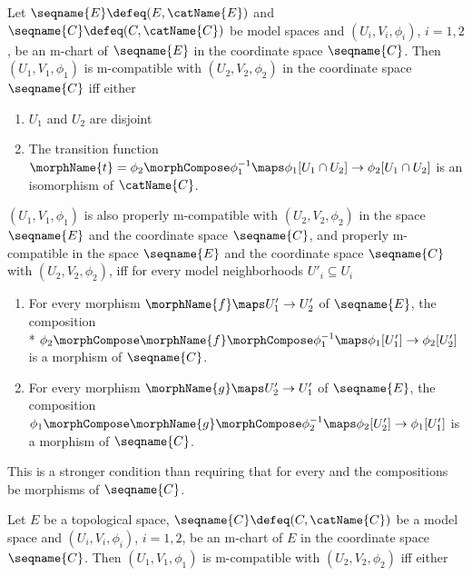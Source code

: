\documentclass{article}
\begin{document}
\begin{definition}[M-compatibility]
\label{def:M-compat}
Let $\seqname{E} \defeq (E, \catName{E})$ and
$\seqname{C} \defeq (C, \catName{C})$ be model spaces and
$(U_i, V_i, \phi_i)$, $i=1,2$, be an m-chart of $\seqname{E}$ in the
coordinate space $\seqname{C}$. Then $(U_1, V_1, \phi_1)$ is
m-compatible with $(U_2, V_2, \phi_2)$ in the coordinate space
$\seqname{C}$ iff either

\begin{enumerate}
\item $U_1$ and $U_2$ are disjoint

\item The transition function
$
  \morphName{t}=\phi_2 \morphCompose \phi^{-1}_1
  \maps \phi_1[U_1 \cap U_2] \to \phi_2[U_1 \cap U_2]
$
is an isomorphism of $\catName{C}$.
\end{enumerate}

$(U_1, V_1, \phi_1)$ is also properly m-compatible with
\nobreaks
  {{
    $(U_2, V_2, \phi_2)$
  }}
in the space $\seqname{E}$ and the coordinate space $\seqname{C}$, and
properly m-compatible in the space $\seqname{E}$ and the coordinate
space $\seqname{C}$ with
\nobreaks
  {{
    $(U_2, V_2, \phi_2)$,
  }}
iff
for every model neighborhoods $U'_i \subseteq U_i$

\begin{enumerate}
\item
For every morphism $\morphName{f} \maps U'_1 \to U'_2$ of $\seqname{E}$,
the composition \\*
$
  \phi_2 \morphCompose \morphName{f} \morphCompose \phi^{-1}_1
  \maps \phi_1[U'_1] \to \phi_2[U'_2]
$
is a morphism of $\seqname{C}$.

\item
For every morphism $\morphName{g} \maps U'_2 \to U'_1$ of $\seqname{E}$,
the composition
$
  \phi_1 \morphCompose \morphName{g} \morphCompose \phi^{-1}_2
  \maps \phi_2[U'_2] \to \phi_1[U'_1]
$
is a morphism of $\seqname{C}$.
\end{enumerate}

\begin{remark}
This is a stronger condition than requiring that for every
 and
 the compositions be
morphisms of $\seqname{C}$.
\end{remark}

Let $E$ be a topological space, $\seqname{C} \defeq (C, \catName{C})$ be
a model space and $(U_i, V_i, \phi_i)$, $i=1,2$, be an m-chart of $E$ in
the coordinate space $\seqname{C}$. Then $(U_1, V_1, \phi_1)$ is
m-compatible with $(U_2, V_2, \phi_2)$ iff either


\end{definition}
\end{document}
